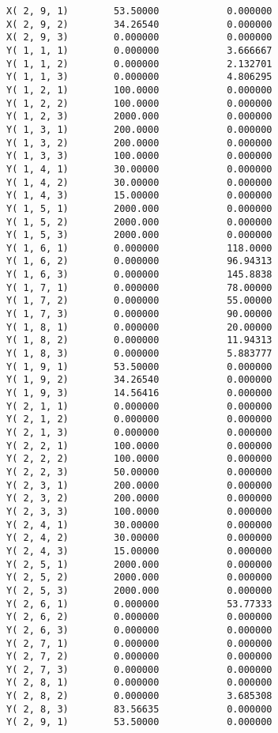 \documentclass[12pt]{article}
\begin{document}
\begin{appendices}
\begin{lstlisting}
X( 2, 9, 1)        53.50000            0.000000
X( 2, 9, 2)        34.26540            0.000000
X( 2, 9, 3)        0.000000            0.000000
Y( 1, 1, 1)        0.000000            3.666667
Y( 1, 1, 2)        0.000000            2.132701
Y( 1, 1, 3)        0.000000            4.806295
Y( 1, 2, 1)        100.0000            0.000000
Y( 1, 2, 2)        100.0000            0.000000
Y( 1, 2, 3)        2000.000            0.000000
Y( 1, 3, 1)        200.0000            0.000000
Y( 1, 3, 2)        200.0000            0.000000
Y( 1, 3, 3)        100.0000            0.000000
Y( 1, 4, 1)        30.00000            0.000000
Y( 1, 4, 2)        30.00000            0.000000
Y( 1, 4, 3)        15.00000            0.000000
Y( 1, 5, 1)        2000.000            0.000000
Y( 1, 5, 2)        2000.000            0.000000
Y( 1, 5, 3)        2000.000            0.000000
Y( 1, 6, 1)        0.000000            118.0000
Y( 1, 6, 2)        0.000000            96.94313
Y( 1, 6, 3)        0.000000            145.8838
Y( 1, 7, 1)        0.000000            78.00000
Y( 1, 7, 2)        0.000000            55.00000
Y( 1, 7, 3)        0.000000            90.00000
Y( 1, 8, 1)        0.000000            20.00000
Y( 1, 8, 2)        0.000000            11.94313
Y( 1, 8, 3)        0.000000            5.883777
Y( 1, 9, 1)        53.50000            0.000000
Y( 1, 9, 2)        34.26540            0.000000
Y( 1, 9, 3)        14.56416            0.000000
Y( 2, 1, 1)        0.000000            0.000000
Y( 2, 1, 2)        0.000000            0.000000
Y( 2, 1, 3)        0.000000            0.000000
Y( 2, 2, 1)        100.0000            0.000000
Y( 2, 2, 2)        100.0000            0.000000
Y( 2, 2, 3)        50.00000            0.000000
Y( 2, 3, 1)        200.0000            0.000000
Y( 2, 3, 2)        200.0000            0.000000
Y( 2, 3, 3)        100.0000            0.000000
Y( 2, 4, 1)        30.00000            0.000000
Y( 2, 4, 2)        30.00000            0.000000
Y( 2, 4, 3)        15.00000            0.000000
Y( 2, 5, 1)        2000.000            0.000000
Y( 2, 5, 2)        2000.000            0.000000
Y( 2, 5, 3)        2000.000            0.000000
Y( 2, 6, 1)        0.000000            53.77333
Y( 2, 6, 2)        0.000000            0.000000
Y( 2, 6, 3)        0.000000            0.000000
Y( 2, 7, 1)        0.000000            0.000000
Y( 2, 7, 2)        0.000000            0.000000
Y( 2, 7, 3)        0.000000            0.000000
Y( 2, 8, 1)        0.000000            0.000000
Y( 2, 8, 2)        0.000000            3.685308
Y( 2, 8, 3)        83.56635            0.000000
Y( 2, 9, 1)        53.50000            0.000000

\end{lstlisting}
\end{appendices}
\end{document}
